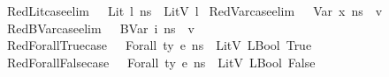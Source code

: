 \begin{isabellebody}
\isamarkupfalse%
\ RedLit{\isacharunderscore}{\kern0pt}case{\isacharbrackleft}{\kern0pt}elim{\isacharbang}{\kern0pt}{\isacharbrackright}{\kern0pt}{\isacharcolon}{\kern0pt}\ {\isachardoublequoteopen}{\isasymLambda}{\isacharcomma}{\kern0pt}{\isasymGamma}{\isacharcomma}{\kern0pt}{\isasymOmega}\ {\isasymturnstile}\ {\isasymlangle}{\isacharparenleft}{\kern0pt}Lit\ l{\isacharparenright}{\kern0pt}{\isacharcomma}{\kern0pt}\ n{\isacharunderscore}{\kern0pt}s{\isasymrangle}\ {\isasymDown}\ LitV\ l{\isachardoublequoteclose}\isanewline
{}\isamarkupfalse%
\ RedVar{\isacharunderscore}{\kern0pt}case{\isacharbrackleft}{\kern0pt}elim{\isacharbang}{\kern0pt}{\isacharbrackright}{\kern0pt}{\isacharcolon}{\kern0pt}\ {\isachardoublequoteopen}{\isasymLambda}{\isacharcomma}{\kern0pt}{\isasymGamma}{\isacharcomma}{\kern0pt}{\isasymOmega}\ {\isasymturnstile}\ {\isasymlangle}{\isacharparenleft}{\kern0pt}Var\ x{\isacharparenright}{\kern0pt}{\isacharcomma}{\kern0pt}\ n{\isacharunderscore}{\kern0pt}s{\isasymrangle}\ {\isasymDown}\ v{\isachardoublequoteclose}\isanewline
{}\isamarkupfalse%
\ RedBVar{\isacharunderscore}{\kern0pt}case{\isacharbrackleft}{\kern0pt}elim{\isacharbang}{\kern0pt}{\isacharbrackright}{\kern0pt}{\isacharcolon}{\kern0pt}\ {\isachardoublequoteopen}{\isasymLambda}{\isacharcomma}{\kern0pt}{\isasymGamma}{\isacharcomma}{\kern0pt}{\isasymOmega}\ {\isasymturnstile}\ {\isasymlangle}{\isacharparenleft}{\kern0pt}BVar\ i{\isacharparenright}{\kern0pt}{\isacharcomma}{\kern0pt}\ n{\isacharunderscore}{\kern0pt}s{\isasymrangle}\ {\isasymDown}\ v{\isachardoublequoteclose}\isanewline
{}\isamarkupfalse%
\ RedForallTrue{\isacharunderscore}{\kern0pt}case{\isacharcolon}{\kern0pt}\ {\isachardoublequoteopen}{\isasymLambda}{\isacharcomma}{\kern0pt}{\isasymGamma}{\isacharcomma}{\kern0pt}{\isasymOmega}\ {\isasymturnstile}\ {\isasymlangle}Forall\ ty\ e{\isacharcomma}{\kern0pt}\ n{\isacharunderscore}{\kern0pt}s{\isasymrangle}\ {\isasymDown}\ LitV\ {\isacharparenleft}{\kern0pt}LBool\ True{\isacharparenright}{\kern0pt}{\isachardoublequoteclose}\isanewline
{}\isamarkupfalse%
\ RedForallFalse{\isacharunderscore}{\kern0pt}case{\isacharcolon}{\kern0pt}\ {\isachardoublequoteopen}{\isasymLambda}{\isacharcomma}{\kern0pt}{\isasymGamma}{\isacharcomma}{\kern0pt}{\isasymOmega}\ {\isasymturnstile}\ {\isasymlangle}Forall\ ty\ e{\isacharcomma}{\kern0pt}\ n{\isacharunderscore}{\kern0pt}s{\isasymrangle}\ {\isasymDown}\ LitV\ {\isacharparenleft}{\kern0pt}LBool\ False{\isacharparenright}{\kern0pt}{\isachardoublequoteclose}\isanewline

\end{isabellebody}
